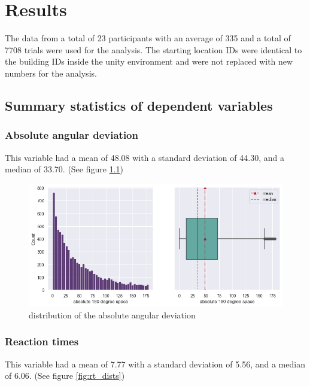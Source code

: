 \chapter{Results}

The data from a total of 23 participants with an average of 335 and a total of 7708 trials were used for the analysis. The starting location IDs were identical to the building IDs inside the unity environment and were not replaced with new numbers for the analysis.

\section{Summary statistics of dependent variables}

\subsection{Absolute angular deviation}

This variable had a mean of 48.08 with a standard deviation of 44.30, and a median of 33.70. (See figure \ref{fig:angular_dev_dists})

\begin{figure}[!htb]
	\centering
	\includegraphics[width=150mm]{figures/angular_deviation_hist_box_23.png}
	\caption[Distribution of the absolute angular deviation]{distribution of the absolute angular deviation}
	\label{fig:angular_dev_dists}
\end{figure}

\subsection{Reaction times}

This variable had a mean of 7.77 with a standard deviation of 5.56, and a median of 6.06. (See figure \ref{fig:rt_dists})

